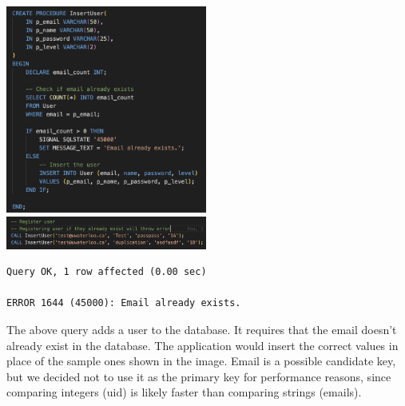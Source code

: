 \documentclass[12pt, a4paper]{article}
\begin{document}
\begin{center}
    \includegraphics[width=250px]{R6/q1}
    \includegraphics[width=250px]{R6/q1_1}
    \begin{verbatim}
Query OK, 1 row affected (0.00 sec)

ERROR 1644 (45000): Email already exists.
    \end{verbatim}
\end{center}
The above query adds a user to the database. It requires that the email doesn't already exist in the database. The application would insert the correct values in place of the sample ones shown in the image. Email is a possible candidate key, but we decided not to use it as the primary key for performance reasons, since comparing integers (uid) is likely faster than comparing strings (emails).
\end{document}
